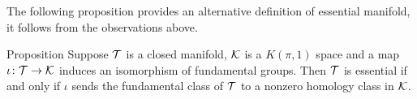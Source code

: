The following proposition provides an alternative definition of essential manifold, it follows from the observations above.

\begin{thm}{Proposition}
Suppose $\mathcal{T}$ is a closed manifold, 
$\mathcal{K}$ is a $K(\pi,1)$ space and a map $\iota\colon\mathcal{T}\to \mathcal{K}$ induces an isomorphism of fundamental groups.
Then $\mathcal{T}$ is essential if and only if $\iota$ sends the fundamental class of $\mathcal{T}$ to a nonzero homology class in $\mathcal{K}$.
\end{thm}



